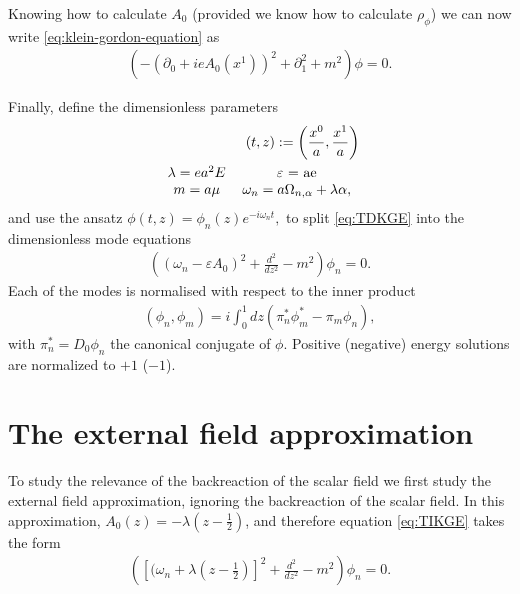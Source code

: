 		Knowing how to calculate $A_0$ (provided we know how to calculate $\rho_\phi$) we can now write \eqref{eq:klein-gordon-equation} as 
		\begin{align}
			\left( -(\partial_0 +ie A_0(x^{1}))^2 + \partial_1^2 + m^2 \right) \phi = 0.
			\label{eq:TDKGE}
		\end{align}

Finally, define the dimensionless parameters 
		\begin{align}
			\begin{split}
				(t, z) := \left(\frac{x^{0}}{a}	,\frac{x^{1}}{a}	  \right) \\
				\begin{tabular}{cc}
					$\lambda = ea^2E$  &
				$\varepsilon$ = ae \\
				$m = a\mu$ & 
				$\omega_n = a\Omega_{n, \alpha} + \lambda \alpha,$
				\end{tabular}
			\end{split}
		\end{align}
		and use the ansatz
		$	\phi(t, z) = \phi_n(z) e^{-i\omega_n t},$
		to split \eqref{eq:TDKGE} into the dimensionless mode equations 
		\begin{align}
			\left( (\omega_n - \varepsilon A_0 )^2 + \frac{d^2}{dz^2}- m^2 \right) \phi_n = 0.
		\label{eq:TIKGE}
		\end{align}
		Each of the modes is normalised with respect to the inner product
		\begin{align}
			(\phi_n, \phi_m) = i \int_{0}^{1} dz \left( \pi^*_n \phi^*_m - \pi_m \phi_n \right),
			\label{eq:symplectic-inner-product}
		\end{align}
		with $\pi_n^* = D_0\phi_n$ the canonical conjugate of $\phi.$ Positive (negative) energy solutions are normalized to $+1$ ($-1$).

\section{The external field approximation}
To study the relevance of the backreaction of the scalar field we first study the external field approximation, ignoring the backreaction of the scalar field. In this approximation, $A_0(z) = -\lambda \left( z-\frac{1}{2} \right) $, and therefore equation \eqref{eq:TIKGE} takes the form
		\begin{align}
			\left( \left[(\omega_n + \lambda\left( z-\frac{1}{2} \right)\right] ^2 + \frac{d^2}{dz^2} - m^2 \right) \phi_n = 0.
			\label{eq:klein-gordon-in-the-external-field-approximation}
		\end{align}

